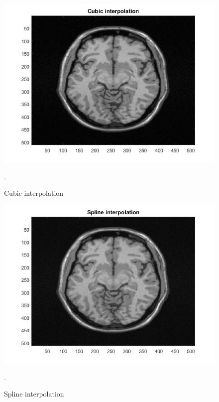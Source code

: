 \begin{figure}[H]
\centering{}\includegraphics[scale=0.4]{figures/Module_10/Module_10_c}\caption{Cubic interpolation}. 
\label{fig: Module10_c}
\end{figure}

\begin{figure}[H]
\centering{}\includegraphics[scale=0.4]{figures/Module_10/Module_10_s}\caption{Spline interpolation}. 
\label{fig: Module10_s}
\end{figure}

